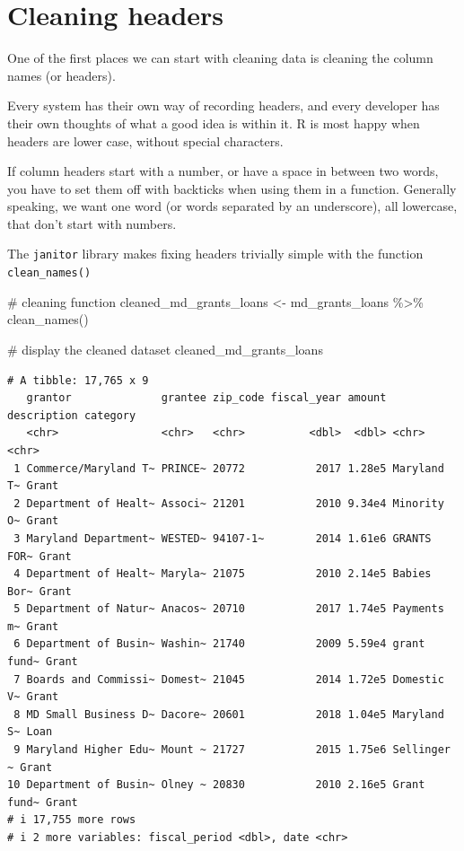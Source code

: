 \documentclass[
  letterpaper,
  DIV=11,
  numbers=noendperiod]{scrreprt}
\newenvironment{Shaded}{\begin{snugshade}}{\end{snugshade}}
\newcommand{\CommentTok}[1]{\textcolor[rgb]{0.37,0.37,0.37}{#1}}
\newcommand{\FunctionTok}[1]{\textcolor[rgb]{0.28,0.35,0.67}{#1}}
\newcommand{\NormalTok}[1]{\textcolor[rgb]{0.00,0.23,0.31}{#1}}
\newcommand{\OtherTok}[1]{\textcolor[rgb]{0.00,0.23,0.31}{#1}}
\newcommand{\SpecialCharTok}[1]{\textcolor[rgb]{0.37,0.37,0.37}{#1}}
\begin{document}
\hypertarget{cleaning-headers}{%
\section{Cleaning headers}\label{cleaning-headers}}

One of the first places we can start with cleaning data is cleaning the
column names (or headers).

Every system has their own way of recording headers, and every developer
has their own thoughts of what a good idea is within it. R is most happy
when headers are lower case, without special characters.

If column headers start with a number, or have a space in between two
words, you have to set them off with backticks when using them in a
function. Generally speaking, we want one word (or words separated by an
underscore), all lowercase, that don't start with numbers.

The \texttt{janitor} library makes fixing headers trivially simple with
the function \texttt{clean\_names()}

\begin{Shaded}
\begin{Highlighting}[]
\CommentTok{\# cleaning function}
\NormalTok{cleaned\_md\_grants\_loans }\OtherTok{\textless{}{-}}\NormalTok{ md\_grants\_loans }\SpecialCharTok{\%\textgreater{}\%}
  \FunctionTok{clean\_names}\NormalTok{()}

\CommentTok{\# display the cleaned dataset}
\NormalTok{cleaned\_md\_grants\_loans}
\end{Highlighting}
\end{Shaded}

\begin{verbatim}
# A tibble: 17,765 x 9
   grantor              grantee zip_code fiscal_year amount description category
   <chr>                <chr>   <chr>          <dbl>  <dbl> <chr>       <chr>   
 1 Commerce/Maryland T~ PRINCE~ 20772           2017 1.28e5 Maryland T~ Grant   
 2 Department of Healt~ Associ~ 21201           2010 9.34e4 Minority O~ Grant   
 3 Maryland Department~ WESTED~ 94107-1~        2014 1.61e6 GRANTS FOR~ Grant   
 4 Department of Healt~ Maryla~ 21075           2010 2.14e5 Babies Bor~ Grant   
 5 Department of Natur~ Anacos~ 20710           2017 1.74e5 Payments m~ Grant   
 6 Department of Busin~ Washin~ 21740           2009 5.59e4 grant fund~ Grant   
 7 Boards and Commissi~ Domest~ 21045           2014 1.72e5 Domestic V~ Grant   
 8 MD Small Business D~ Dacore~ 20601           2018 1.04e5 Maryland S~ Loan    
 9 Maryland Higher Edu~ Mount ~ 21727           2015 1.75e6 Sellinger ~ Grant   
10 Department of Busin~ Olney ~ 20830           2010 2.16e5 Grant fund~ Grant   
# i 17,755 more rows
# i 2 more variables: fiscal_period <dbl>, date <chr>
\end{verbatim}
\end{document}
